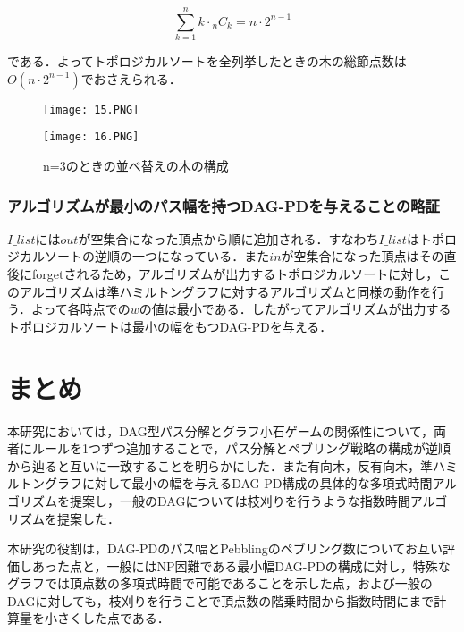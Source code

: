 \documentclass{kuisthesis}           %
\begin{document}
 \[
 \sum_{k=1}^{n}k\cdot{}_{n}C_{k}= n\cdot2^{n-1}
 \]
 
 である．よってトポロジカルソートを全列挙したときの木の総節点数は$O(n\cdot2^{n-1})$でおさえられる．

 \begin{figure}[H]
  \begin{minipage}[b]{.5\linewidth}
    \centering
    \texttt{[image: 15.PNG]}
  \end{minipage}%
  \begin{minipage}[b]{.5\linewidth}
    \centering
    \texttt{[image: 16.PNG]}
  \end{minipage}
  \caption{n=3のときの並べ替えの木の構成}
  \label{fig:9}
 \end{figure}

 
 
 \subsubsection{アルゴリズムが最小のパス幅を持つDAG-PDを与えることの略証}

 $I\_list$には$out$が空集合になった頂点から順に追加される．すなわち$I\_list$はトポロジカルソートの逆順の一つになっている．また$in$が空集合になった頂点はその直後にforgetされるため，アルゴリズムが出力するトポロジカルソートに対し，このアルゴリズムは準ハミルトングラフに対するアルゴリズムと同様の動作を行う．よって各時点での$w$の値は最小である．したがってアルゴリズムが出力するトポロジカルソートは最小の幅をもつDAG-PDを与える．

 
\section{まとめ}\label{sec-conclusion}

本研究においては，DAG型パス分解とグラフ小石ゲームの関係性について，両者にルールを1つずつ追加することで，パス分解とペブリング戦略の構成が逆順から辿ると互いに一致することを明らかにした．また有向木，反有向木，準ハミルトングラフに対して最小の幅を与えるDAG-PD構成の具体的な多項式時間アルゴリズムを提案し，一般のDAGについては枝刈りを行うような指数時間アルゴリズムを提案した．

本研究の役割は，DAG-PDのパス幅とPebblingのペブリング数についてお互い評価しあった点と，一般にはNP困難である最小幅DAG-PDの構成に対し，特殊なグラフでは頂点数の多項式時間で可能であることを示した点，および一般のDAGに対しても，枝刈りを行うことで頂点数の階乗時間から指数時間にまで計算量を小さくした点である．
\end{document}
